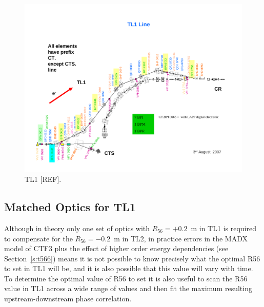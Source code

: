 \begin{landscape}
	\begin{figure}
  		\centering
  		\includegraphics[height=\textwidth]{Figures/propagation/TL1}
  		\caption{TL1 [REF].}
  		\label{f:tl1Layout}
	\end{figure}
\end{landscape}

\subsection{Matched Optics for TL1}
\label{ss:tl1Optics}

Although in theory only one set of optics with \(R_{56} = +0.2\)~m in TL1 is required to compensate for the \(R_{56} = -0.2\)~m in TL2, in practice errors in the MADX model of CTF3 plus the effect of higher order energy dependencies (see Section~\ref{s:t566}) means it is not possible to know precisely what the optimal R56 to set in TL1 will be, and it is also possible that this value will vary with time. To determine the optimal value of R56 to set it is also useful to scan the R56 value in TL1 across a wide range of values and then fit the maximum resulting upstream-downstream phase correlation.

